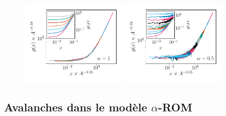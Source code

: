 \begin{figure}[h]
\includegraphics[width=0.45\textwidth]{Chapitre3/Figures/Interpretation/PCorr/PCorr_rescaled_alpha1_mean.pdf}
\includegraphics[width=0.45\textwidth]{Chapitre3/Figures/Interpretation/PCorr/PCorr_rescaled_alpha05_mean.pdf}
\caption{}
\label{fig:annexePcorrAlpha}
\end{figure}

\subsection{Avalanches dans le modèle $\alpha$-ROM}

\label{sec:AvTBLRRAnnexe}


